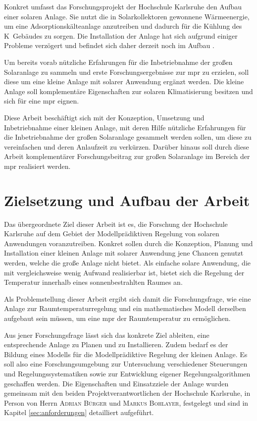 Konkret umfasst das Forschungsprojekt der Hochschule Karlsruhe den Aufbau einer solaren Anlage. Sie nutzt die in Solarkollektoren gewonnene Wärmeenergie, um eine Adsorptionskälteanlage anzutreiben und dadurch für die Kühlung des K~Gebäudes zu sorgen. Die Installation der Anlage hat sich aufgrund einiger Probleme verzögert und befindet sich daher derzeit noch im Aufbau \cite{hska}.

Um bereits vorab nützliche Erfahrungen für die Inbetriebnahme der großen Solaranlage zu sammeln und erste Forschungsergebnisse zur \acrlong{mpr} zu erzielen, soll diese um eine kleine Anlage mit solarer Anwendung ergänzt werden. Die kleine Anlage soll komplementäre Eigenschaften zur solaren Klimatisierung besitzen und sich für eine \acrlong{mpr} eignen.

Diese Arbeit beschäftigt sich mit der Konzeption, Umsetzung und Inbetriebnahme einer kleinen Anlage, mit deren Hilfe nützliche Erfahrungen für die Inbetriebnahme der großen Solaranlage gesammelt werden sollen, um diese zu vereinfachen und deren Anlaufzeit zu verkürzen. Darüber hinaus soll durch diese Arbeit komplementärer Forschungsbeitrag zur großen Solaranlage im Bereich der \acrlong{mpr} realisiert werden.

\section{Zielsetzung und Aufbau der Arbeit}
\label{sec:ziel}

Das übergeordnete Ziel dieser Arbeit ist es, die Forschung der Hochschule Karlsruhe auf dem Gebiet der Modellprädiktiven Regelung von solaren Anwendungen voranzutreiben.
Konkret sollen durch die Konzeption, Planung und Installation einer kleinen Anlage mit solarer Anwendung jene Chancen genutzt werden, welche die große Anlage nicht bietet.
Als einfache solare Anwendung, die mit vergleichsweise wenig Aufwand realisierbar ist, bietet sich die Regelung der Temperatur innerhalb eines sonnenbestrahlten Raumes an.

Als Problemstellung dieser Arbeit ergibt sich damit die Forschungsfrage, wie eine Anlage zur Raumtemperaturregelung und ein mathematisches Modell derselben aufgebaut sein müssen, um eine \acrlong{mpr} der Raumtemperatur zu ermöglichen.

Aus jener Forschungsfrage lässt sich das konkrete Ziel ableiten, eine entsprechende Anlage zu Planen und zu Installieren. 
Zudem bedarf es der Bildung eines Modells für die Modellprädiktive Regelung der kleinen Anlage.
Es soll also eine Forschungsumgebung zur Untersuchung verschiedener Steuerungen und Regelungssystematiken sowie zur Entwicklung eigener Regelungsalgorithmen geschaffen werden.
Die Eigenschaften und Einsatzziele der Anlage wurden gemeinsam mit den beiden Projektverantwortlichen der Hochschule Karlsruhe, in Person von Herrn \textsc{Adrian Bürger} und \textsc{Markus Bohlayer}, festgelegt und sind in Kapitel \ref{sec:anforderungen} detailliert aufgeführt.


